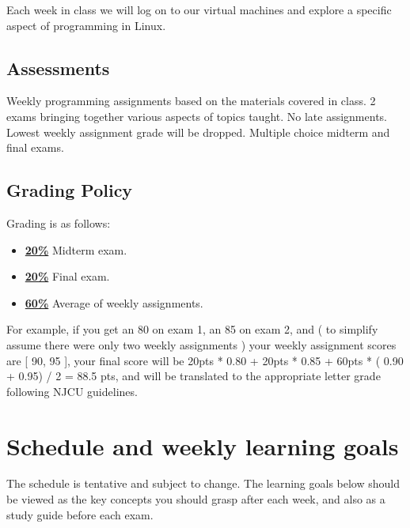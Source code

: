 \documentclass[11pt]{article}
\begin{document}
Each week in class we will log on to our virtual machines and explore a specific aspect of programming in Linux.

\subsection*{Assessments}

Weekly programming assignments based on the materials covered in class. 2 exams bringing together various aspects of topics taught. No late assignments. Lowest weekly assignment grade will be dropped. Multiple choice midterm and final exams.

\subsection*{Grading Policy}
Grading is as follows:

\begin{itemize}
	\item \underline{\textbf{20\%}} Midterm exam.
	\item \underline{\textbf{20\%}} Final exam.
	\item \underline{\textbf{60\%}} Average of weekly assignments. 
\end{itemize}

For example, if you get an 80 on exam 1, an 85 on exam 2, and ( to simplify assume there were only two weekly assignments ) your weekly assignment scores are [ 90, 95 ], your final score will be 20pts * 0.80 + 20pts * 0.85 + 60pts * ( 0.90 + 0.95) / 2 = 88.5 pts, and will be translated to the appropriate letter grade following NJCU guidelines.

\newpage
\section*{Schedule and weekly learning goals}

The schedule is tentative and subject to change. The learning goals below should be viewed as the key concepts you should grasp after each week, and also as a study guide before each exam.
\newpage
\end{document}
